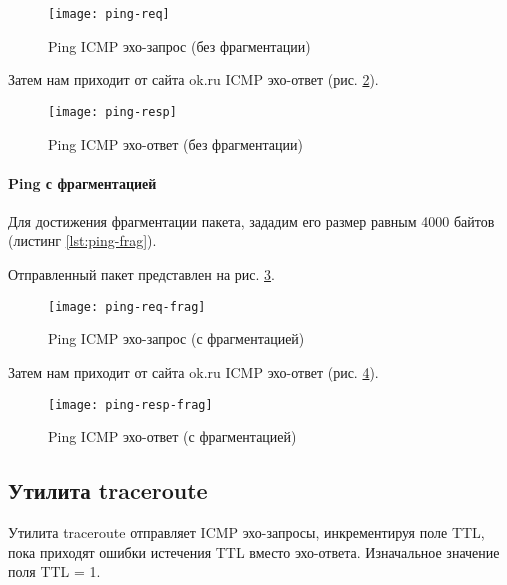

\begin{figure}[H]
	\centering
	\texttt{[image: ping-req]}
	\caption{Ping ICMP эхо-запрос (без фрагментации)}
	\label{fig:ping-req}
\end{figure}

Затем нам приходит от сайта ok.ru ICMP эхо-ответ (рис. \ref{fig:ping-resp}).

\begin{figure}[H]
	\centering
	\texttt{[image: ping-resp]}
	\caption{Ping ICMP эхо-ответ (без фрагментации)}
	\label{fig:ping-resp}
\end{figure}

\newpage

\paragraph{Ping с фрагментацией}

Для достижения фрагментации пакета, зададим его размер равным 4000 байтов (листинг \ref{lst:ping-frag}).



Отправленный пакет представлен на рис. \ref{fig:ping-req-frag}.

\begin{figure}[H]
	\centering
	\texttt{[image: ping-req-frag]}
	\caption{Ping ICMP эхо-запрос (с фрагментацией)}
	\label{fig:ping-req-frag}
\end{figure}

Затем нам приходит от сайта ok.ru ICMP эхо-ответ (рис. \ref{fig:ping-resp-frag}).

\begin{figure}[H]
	\centering
	\texttt{[image: ping-resp-frag]}
	\caption{Ping ICMP эхо-ответ (с фрагментацией)}
	\label{fig:ping-resp-frag}
\end{figure}

\subsection{Утилита traceroute}

Утилита traceroute отправляет ICMP эхо-запросы, инкрементируя поле TTL, пока приходят ошибки истечения TTL вместо эхо-ответа. Изначальное значение поля TTL = 1.

